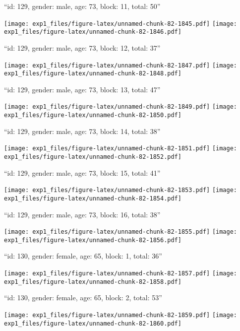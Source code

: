 \documentclass[11pt,,]{article}
\begin{document}
\newpage
[1] 

``id: 129, gender: male, age: 73, block: 11, total: 50''

\texttt{[image: exp1\_files/figure-latex/unnamed-chunk-82-1845.pdf]}
\texttt{[image: exp1\_files/figure-latex/unnamed-chunk-82-1846.pdf]}

\newpage
[1] 

``id: 129, gender: male, age: 73, block: 12, total: 37''

\texttt{[image: exp1\_files/figure-latex/unnamed-chunk-82-1847.pdf]}
\texttt{[image: exp1\_files/figure-latex/unnamed-chunk-82-1848.pdf]}

\newpage
[1] 

``id: 129, gender: male, age: 73, block: 13, total: 47''

\texttt{[image: exp1\_files/figure-latex/unnamed-chunk-82-1849.pdf]}
\texttt{[image: exp1\_files/figure-latex/unnamed-chunk-82-1850.pdf]}

\newpage
[1] 

``id: 129, gender: male, age: 73, block: 14, total: 38''

\texttt{[image: exp1\_files/figure-latex/unnamed-chunk-82-1851.pdf]}
\texttt{[image: exp1\_files/figure-latex/unnamed-chunk-82-1852.pdf]}

\newpage
[1] 

``id: 129, gender: male, age: 73, block: 15, total: 41''

\texttt{[image: exp1\_files/figure-latex/unnamed-chunk-82-1853.pdf]}
\texttt{[image: exp1\_files/figure-latex/unnamed-chunk-82-1854.pdf]}

\newpage
[1] 

``id: 129, gender: male, age: 73, block: 16, total: 38''

\texttt{[image: exp1\_files/figure-latex/unnamed-chunk-82-1855.pdf]}
\texttt{[image: exp1\_files/figure-latex/unnamed-chunk-82-1856.pdf]}

\newpage
[1] 

``id: 130, gender: female, age: 65, block: 1, total: 36''

\texttt{[image: exp1\_files/figure-latex/unnamed-chunk-82-1857.pdf]}
\texttt{[image: exp1\_files/figure-latex/unnamed-chunk-82-1858.pdf]}

\newpage
[1] 

``id: 130, gender: female, age: 65, block: 2, total: 53''

\texttt{[image: exp1\_files/figure-latex/unnamed-chunk-82-1859.pdf]}
\texttt{[image: exp1\_files/figure-latex/unnamed-chunk-82-1860.pdf]}
\end{document}

